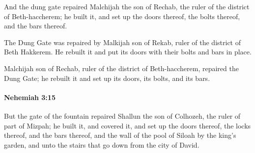 			\begin{versebox}
					\item[BHS] 
					\item[LXX] 
					\item[ASV] And the dung gate repaired Malchijah the son of Rechab, the ruler of the district of Beth-haccherem; he built it, and set up the doors thereof, the bolts thereof, and the bars thereof.
					\item[NIV] The Dung Gate was repaired by Malkijah son of Rekab, ruler of the district of Beth Hakkerem. He rebuilt it and put its doors with their bolts and bars in place.
					\item[NRSV] Malchijah son of Rechab, ruler of the district of Beth-haccherem, repaired the Dung Gate; he rebuilt it and set up its doors, its bolts, and its bars.
			\end{versebox}

		\paragraph{Nehemiah 3:15} %
			\label{NEHEMIAH-3-15}

			But the gate of the fountain repaired Shallun the son of Colhozeh, the ruler of part of Mizpah; he built it, and covered it, and set up the doors thereof, the locks thereof, and the bars thereof, and the wall of the pool of Siloah by the king’s garden, and unto the stairs that go down from the city of David.


